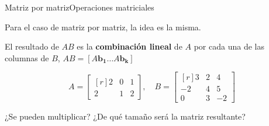 \documentclass[spanish, c]{beamer}
\begin{document}
\begin{frame}{Matriz por matriz}{Operaciones matriciales}

    Para el caso de matriz por matriz, la idea es la misma.

    \bigskip

    El resultado de $AB$ es la \textbf{combinación lineal} de $A$ por cada una de las columnas de $B$, $AB = [A\mathbf{b_1} \dots A\mathbf{b_k}]$

    \bigskip
    
    \[%
        A = %
        \begin{bmatrix*}[r]
            2 & 0 & 1 \\
            2 & 1 & 2
        \end{bmatrix*}, \quad
        B = %
        \begin{bmatrix*}[r]
            3 & 2 & 4 \\
            -2 & 4 & 5 \\
            0 & 3 & -2
        \end{bmatrix*}
    \] \pause

    \bigskip

    ¿Se pueden multiplicar? \pause ¿De qué tamaño será la matriz resultante?    

\end{frame}
\end{document}
